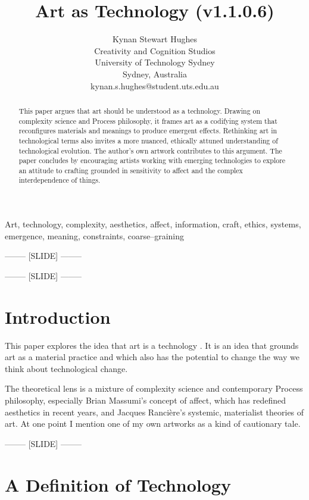 \documentclass[letter:wpaper]{article}
\title{Art as Technology (v1.1.0.6)}
\author{Kynan Stewart Hughes\\
Creativity and Cognition Studios\\
University of Technology Sydney\\
Sydney, Australia\\
kynan.s.hughes@student.uts.edu.au\\
\newline
\newline
}
\begin{document}
 
\maketitle
\begin{abstract}
    This paper argues that art should be understood as a technology. Drawing on complexity science and Process philosophy, it frames art as a codifying system that reconfigures materials and meanings to produce emergent effects. Rethinking art in technological terms also invites a more nuanced, ethically attuned understanding of technological evolution. The author’s own artwork contributes to this argument. The paper concludes by encouraging artists working with emerging technologies to explore an attitude to crafting grounded in sensitivity to affect and the complex interdependence of things.
\end{abstract}


Art, technology, complexity, aesthetics, affect, information, craft, ethics, systems, emergence, meaning, constraints, coarse–graining

-------- [SLIDE] --------

-------- [SLIDE] --------

\section{Introduction}

    This paper explores the idea that art is a technology \citep[pp.74–75]{SauvagnarguesArtmchns2016} \citep{GellThTchnlgyOfEnchntmnt1992} \citep[p.202]{OSullivanFrmAsthtcsToThAbstrctMchn2010}. It is an idea that grounds art as a material practice and which also has the potential to change the way we think about technological change. 
    
    The theoretical lens is a mixture of complexity science and contemporary Process philosophy, especially Brian Massumi's concept of affect, which has redefined aesthetics in recent years, and Jacques Rancière's systemic, materialist theories of art. At one point I mention one of my own artworks as a kind of cautionary tale.

-------- [SLIDE] --------

\section{A Definition of Technology} 
\end{document}
